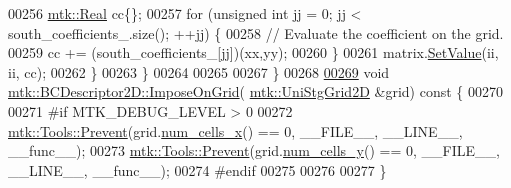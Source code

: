 \begin{DoxyCode}
00256       \hyperlink{group__c01-roots_gac080bbbf5cbb5502c9f00405f894857d}{mtk::Real} cc\{\};
00257       \textcolor{keywordflow}{for} (\textcolor{keywordtype}{unsigned} \textcolor{keywordtype}{int} jj = 0; jj < south\_coefficients\_.size(); ++jj) \{
00258         \textcolor{comment}{// Evaluate the coefficient on the grid.}
00259         cc += (south\_coefficients\_[jj])(xx,yy);
00260       \}
00261       matrix.\hyperlink{classmtk_1_1DenseMatrix_a784ce5784109ac86bfb9d8562b334b13}{SetValue}(ii, ii, cc);
00262     \}
00263   \}
00264 
00265 
00267 \}
00268 
\hypertarget{mtk__bc__descriptor__2d_8cc_source_l00269}{}\hyperlink{classmtk_1_1BCDescriptor2D_a5f0ff1fda1b5266dcd77ba2301c8ba2c}{00269} \textcolor{keywordtype}{void} \hyperlink{classmtk_1_1BCDescriptor2D_a5f0ff1fda1b5266dcd77ba2301c8ba2c}{mtk::BCDescriptor2D::ImposeOnGrid}(
      \hyperlink{classmtk_1_1UniStgGrid2D}{mtk::UniStgGrid2D} &grid)\textcolor{keyword}{ const }\{
00270 
00271 \textcolor{preprocessor}{  #if MTK\_DEBUG\_LEVEL > 0}
00272   \hyperlink{classmtk_1_1Tools_a332324c6f25e66be9dff48c5987a3b9f}{mtk::Tools::Prevent}(grid.\hyperlink{classmtk_1_1UniStgGrid2D_a2d182866a398aba8e4829590e85bf939}{num\_cells\_x}() == 0, \_\_FILE\_\_, \_\_LINE\_\_, \_\_func\_\_);
00273   \hyperlink{classmtk_1_1Tools_a332324c6f25e66be9dff48c5987a3b9f}{mtk::Tools::Prevent}(grid.\hyperlink{classmtk_1_1UniStgGrid2D_aed05a801cc9a76dba0ff203cea58a61a}{num\_cells\_y}() == 0, \_\_FILE\_\_, \_\_LINE\_\_, \_\_func\_\_);
00274 \textcolor{preprocessor}{  #endif}
00275 
00276 
00277 \}
\end{DoxyCode}
